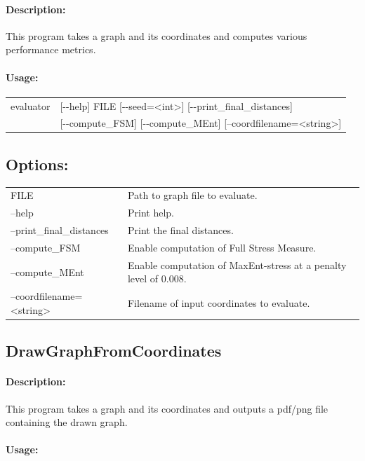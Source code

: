 \documentclass[11pt]{article}
\begin{document}
\paragraph*{Description:} This program takes a graph and its coordinates and computes various performance metrics.
\paragraph*{Usage:\\} 

\begin{tabular}{ll}
evaluator &   [-{}-help] FILE [-{}-seed=<int>] [-{}-print\_final\_distances]  \\
& [-{}-compute\_FSM] [-{}-compute\_MEnt] [--coordfilename=<string>]

\end{tabular}
                          
\subsection*{Options:\\}

\begin{tabularx}{\textwidth}{lX}
  FILE                          & Path to graph file to evaluate.\\
  --help                        & Print help. \\
  --print\_final\_distances     & Print the final distances. \\
  --compute\_FSM                & Enable computation of Full Stress Measure.\\
  --compute\_MEnt               & Enable computation of MaxEnt-stress at a penalty level of 0.008.\\
  --coordfilename=<string>      & Filename of input coordinates to evaluate. \\
\end{tabularx}
\subsection{DrawGraphFromCoordinates}
\paragraph*{Description:} This program takes a graph and its coordinates and outputs a pdf/png file containing the drawn graph.
\paragraph*{Usage:\\} 
\end{document}
